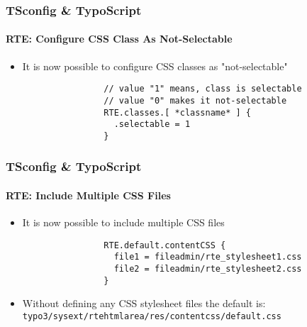 \begin{frame}[fragile]
	\frametitle{TSconfig \& TypoScript}
	\framesubtitle{RTE: Configure CSS Class As Not-Selectable}

	\begin{itemize}
		\item It is now possible to configure CSS classes as "not-selectable"

			\begin{lstlisting}
				// value "1" means, class is selectable
				// value "0" makes it not-selectable
				RTE.classes.[ *classname* ] {
				  .selectable = 1
				}
			\end{lstlisting}

	\end{itemize}

\end{frame}


\begin{frame}[fragile]
	\frametitle{TSconfig \& TypoScript}
	\framesubtitle{RTE: Include Multiple CSS Files}

	\begin{itemize}
		\item It is now possible to include multiple CSS files

			\begin{lstlisting}
				RTE.default.contentCSS {
				  file1 = fileadmin/rte_stylesheet1.css
				  file2 = fileadmin/rte_stylesheet2.css
				}
			\end{lstlisting}

		\item Without defining any CSS stylesheet files the default is:\newline
			\texttt{typo3/sysext/rtehtmlarea/res/contentcss/default.css}

	\end{itemize}

\end{frame}


